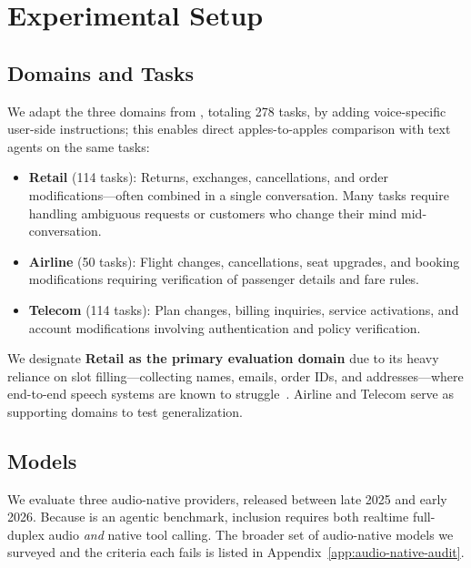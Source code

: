 \section{Experimental Setup}
\label{sec:experiments}

\subsection{Domains and Tasks}

We adapt the three  domains from \tautwobench{}, totaling 278 tasks, by adding voice-specific user-side instructions; this enables direct apples-to-apples comparison with text agents on the same tasks:
\begin{itemize}[nosep,leftmargin=*]
    \item \textbf{Retail} (114 tasks): Returns, exchanges, cancellations, and order modifications---often combined in a single conversation. Many tasks require handling ambiguous requests or customers who change their mind mid-conversation.
    \item \textbf{Airline} (50 tasks): Flight changes, cancellations, seat upgrades, and booking modifications requiring verification of passenger details and fare rules.
    \item \textbf{Telecom} (114 tasks): Plan changes, billing inquiries, service activations, and account modifications involving authentication and policy verification.
\end{itemize}
We designate \textbf{Retail as the primary evaluation domain} due to its heavy reliance on slot filling---collecting names, emails, order IDs, and addresses---where end-to-end speech systems are known to struggle~\citep{li_cb-whisper_2024, si_spokenwoz_2025}. Airline and Telecom serve as supporting domains to test generalization.

\subsection{Models}

We evaluate three audio-native providers, released between late 2025 and early 2026. Because \tauvoice{} is an agentic benchmark, inclusion requires both realtime full-duplex audio \emph{and} native tool calling. The broader set of audio-native models we surveyed and the criteria each fails is listed in Appendix~\ref{app:audio-native-audit}.%

